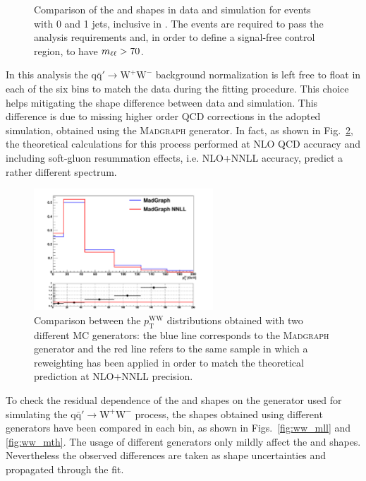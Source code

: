 \begin{figure}[!htb]
\caption{Comparison of the \mll and \mt shapes in data and simulation for events with 0 and 1 jets, inclusive in \pth. The events are required to pass the analysis requirements and, in order to define a signal-free control region, to have $m_{\ell\ell} > 70$\GeV.\label{fig:WW}}
\end{figure}

In this analysis the $\mathrm{q\bar{q}'\to W^{+}W^{-}}$ background normalization is left free to float in each of the six \pth bins to match the data during the fitting procedure. This choice helps mitigating the \pth shape difference between data and simulation. This difference is due to missing higher order QCD corrections in the adopted simulation, obtained using the \textsc{Madgraph} generator. In fact, as shown in Fig.~\ref{fig:ww_wwnlo}, the theoretical calculations for this process performed at NLO QCD accuracy and including soft-gluon resummation effects, i.e. NLO+NNLL accuracy, predict a rather different \pth spectrum.

\begin{figure}[htb]
\centering
\includegraphics[width=0.6\textwidth]{images/WWnlo/WW_WWnlo-v2.pdf}
\caption{Comparison between the $p_\mathrm{T}^\mathrm{WW}$ distributions obtained with two different MC generators: the blue line corresponds to the \textsc{Madgraph} generator and the red line refers to the same sample in which a reweighting has been applied in order to match the theoretical prediction at NLO+NNLL precision. }\label{fig:ww_wwnlo}
\end{figure}

To check the residual dependence of the \mll and \mt shapes on the generator used for simulating the $\mathrm{q\bar{q}'\to W^{+}W^{-}}$ process, the shapes obtained using different generators have been compared in each \pth bin, as shown in Figs.~\ref{fig:ww_mll} and \ref{fig:ww_mth}. The usage of different generators only mildly affect the \mll and \mt shapes. Nevertheless the observed differences are taken as shape uncertainties and propagated through the fit.


